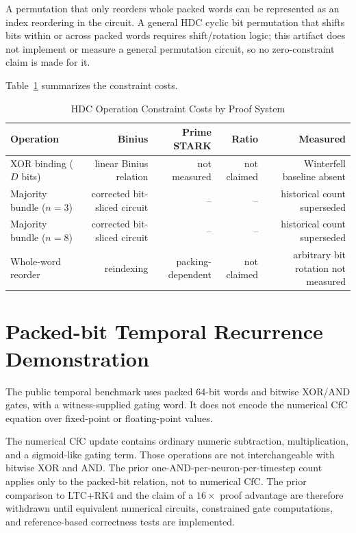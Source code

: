 \documentclass[11pt,twocolumn]{article}
\begin{document}
\begin{corollary}
A permutation that only reorders whole packed words can be represented as an index reordering in the circuit. A general HDC cyclic bit permutation that shifts bits within or across packed words requires shift/rotation logic; this artifact does not implement or measure a general permutation circuit, so no zero-constraint claim is made for it.
\end{corollary}

Table~\ref{tab:alignment} summarizes the constraint costs.

\begin{table}[t]
\centering
\caption{HDC Operation Constraint Costs by Proof System}
\label{tab:alignment}
\begin{tabular}{@{}lrrrr@{}}
\toprule
\textbf{Operation} & \textbf{Binius} & \textbf{Prime STARK} & \textbf{Ratio} & \textbf{Measured} \\
\midrule
XOR binding ($D$ bits) & linear Binius relation & not measured & not claimed & Winterfell baseline absent \\
Majority bundle ($n{=}3$) & corrected bit-sliced circuit & -- & -- & historical count superseded \\
Majority bundle ($n{=}8$) & corrected bit-sliced circuit & -- & -- & historical count superseded \\
Whole-word reorder & reindexing & packing-dependent & not claimed & arbitrary bit rotation not measured \\
\bottomrule
\end{tabular}
\end{table}

\section{Packed-bit Temporal Recurrence Demonstration}
\label{sec:cfc}

The public temporal benchmark uses packed 64-bit words and bitwise XOR/AND gates, with a witness-supplied gating word. It does not encode the numerical CfC equation over fixed-point or floating-point values.

The numerical CfC update contains ordinary numeric subtraction, multiplication, and a sigmoid-like gating term. Those operations are not interchangeable with bitwise XOR and AND. The prior one-AND-per-neuron-per-timestep count applies only to the packed-bit relation, not to numerical CfC. The prior comparison to LTC+RK4 and the claim of a $16\times$ proof advantage are therefore withdrawn until equivalent numerical circuits, constrained gate computations, and reference-based correctness tests are implemented.
\end{document}
